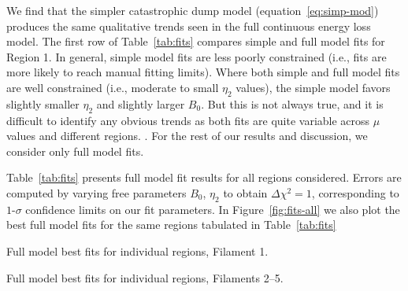 \documentclass[iop, apj, numberedappendix, twocolappendix]{emulateapj}
\begin{document}

We find that the simpler catastrophic dump model (equation~\eqref{eq:simp-mod})
produces the same qualitative trends seen in the full continuous energy loss
model.  The first row of Table~\ref{tab:fits} compares simple and full model fits for
Region 1.  In general, simple model fits are less poorly constrained (i.e.,
fits are more likely to reach manual fitting limits).
Where both simple and full model fits are well constrained (i.e., moderate to
small $\eta_2$ values), the simple model favors slightly smaller $\eta_2$ and
slightly larger $B_0$.  But this is not always true, and it is difficult to
identify any obvious trends as both fits are quite variable across $\mu$ values
and different regions.
.
For the rest of our results and discussion, we consider only full model fits.

Table~\ref{tab:fits} presents full model fit results for all regions
considered. Errors are computed by varying free parameters $B_0$,
$\eta_2$ to obtain $\Delta\chi^2 = 1$, corresponding to $1$-$\sigma$ confidence
limits on our fit parameters.
In Figure~\ref{fig:fits-all} we also plot the best full model fits for the same
regions tabulated in Table~\ref{tab:fits}

\begin{table}[ht]
    \tiny
    \centering
    \caption{Full model best fits for individual regions, Filament 1.
    \label{tab:fits}}
    
\end{table}

\begin{table}[ht]
    \tiny
    \centering
    \caption{Full model best fits for individual regions, Filaments 2--5.
    \label{tab:fits-pt2}}
    
\end{table}
\end{document}
